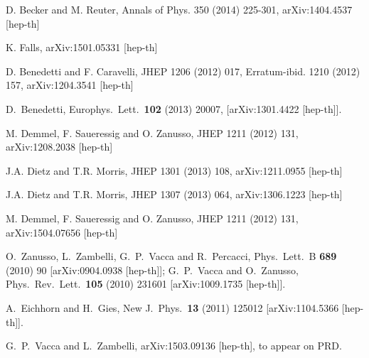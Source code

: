 \documentclass[a4paper,11pt]{revtex4}
\begin{document}
\begin{thebibliography}{99}
D. Becker and M. Reuter,
Annals of Phys. 350 (2014) 225-301,
arXiv:1404.4537 [hep-th]

K. Falls,
arXiv:1501.05331 [hep-th]

D. Benedetti and F. Caravelli,
JHEP 1206 (2012) 017, Erratum-ibid. 1210 (2012) 157,
arXiv:1204.3541 [hep-th]

D.~Benedetti,
Europhys.\ Lett.\  {\bf 102} (2013) 20007,
[arXiv:1301.4422 [hep-th]].

M. Demmel, F. Saueressig and O. Zanusso,
JHEP 1211 (2012) 131,
arXiv:1208.2038 [hep-th]

J.A. Dietz and T.R. Morris,
JHEP 1301 (2013) 108,
arXiv:1211.0955 [hep-th]

J.A. Dietz and T.R. Morris,
JHEP 1307 (2013) 064,
arXiv:1306.1223 [hep-th]

M. Demmel, F. Saueressig and O. Zanusso,
JHEP 1211 (2012) 131,
arXiv:1504.07656 [hep-th]

  O.~Zanusso, L.~Zambelli, G.~P.~Vacca and R.~Percacci,
  Phys.\ Lett.\ B {\bf 689} (2010) 90
  [arXiv:0904.0938 [hep-th]];
  G.~P.~Vacca and O.~Zanusso,
  Phys.\ Rev.\ Lett.\  {\bf 105} (2010) 231601
  [arXiv:1009.1735 [hep-th]].
 
  A.~Eichhorn and H.~Gies,
  New J.\ Phys.\  {\bf 13} (2011) 125012
  [arXiv:1104.5366 [hep-th]].

  G.~P.~Vacca and L.~Zambelli,
  arXiv:1503.09136 [hep-th], to appear on PRD.
  
\end{thebibliography}
\end{document}
